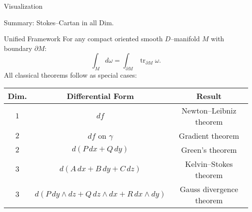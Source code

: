 \begin{frame}{Visualization}
    \begin{center}
\end{center}
\end{frame}

\begin{frame}{Summary: Stokes–Cartan in all Dim.}
\vspace{-0.3cm}
\begin{block}{Unified Framework}
For any compact oriented smooth $D$–manifold $M$ with boundary $\partial M$:
\vspace{-0.2cm}
\[
\boxed{\int_M d\omega=\int_{\partial M}\operatorname{tr}_{\partial M}\omega.}
\]
All classical theorems follow as special cases:
\vspace{-0.2cm}
\small
\begin{center}
\renewcommand{\arraystretch}{1.3}
\begin{tabular}{c|c|c}
\textbf{Dim.} & \textbf{Differential Form} & \textbf{Result}\\
\hline
$1$ & $df$ & Newton–Leibniz theorem\\
$2$ & $df$ on $\gamma$ & Gradient theorem\\
$2$ & $d(P\,dx+Q\,dy)$ & Green’s theorem\\
$3$ & $d(A\,dx+B\,dy+C\,dz)$ & Kelvin–Stokes theorem\\
$3$ & $d(P\,dy\wedge dz+Q\,dz\wedge dx+R\,dx\wedge dy)$ & Gauss divergence theorem
\end{tabular}
\end{center}
\end{block}
\end{frame}



